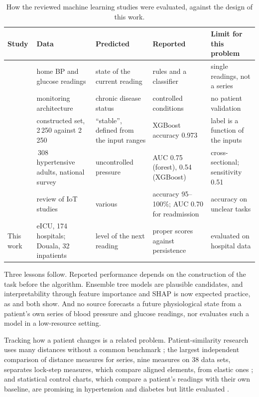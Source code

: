 \begin{table}[htbp]
\centering\footnotesize
\caption{How the reviewed machine learning studies were evaluated, against the design of this work.}\label{tab:ml-studies}
\begin{tabularx}{\textwidth}{@{}>{\raggedright\arraybackslash}p{2.3cm} >{\raggedright\arraybackslash}X >{\raggedright\arraybackslash}X >{\raggedright\arraybackslash}X >{\raggedright\arraybackslash}X@{}}
\toprule
\textbf{Study} & \textbf{Data} & \textbf{Predicted} & \textbf{Reported} & \textbf{Limit for this problem} \\
\midrule
\textcite{chatrati2022} & home BP and glucose readings & state of the current reading & rules and a classifier & single readings, not a series \\
\textcite{tai2024} & monitoring architecture & chronic disease status & controlled conditions & no patient validation \\
\textcite{efendi2025} & constructed set, 2\,250 against 2\,250 & ``stable'', defined from the input ranges & XGBoost accuracy 0.973 & label is a function of the inputs \\
\textcite{mendoza2025} & 1\,308 hypertensive adults, national survey & uncontrolled pressure & AUC 0.75 (forest), 0.54 (XGBoost) & cross-sectional; sensitivity 0.51 \\
\textcite{liu2025review} & review of IoT studies & various & accuracy 95--100\%; AUC 0.70 for readmission & accuracy on unclear tasks \\
\addlinespace
This work & eICU, 174 hospitals; Douala, 32 inpatients & level of the next reading & proper scores against persistence & evaluated on hospital data \\
\bottomrule
\end{tabularx}
\end{table}

Three lessons follow. Reported performance depends on the construction of the task before the algorithm. Ensemble tree models are plausible candidates, and interpretability through feature importance and SHAP is now expected practice, as \textcite{mendoza2025} and \textcite{liu2025ppg} both show. And no source forecasts a future physiological state from a patient's own series of blood pressure and glucose readings, nor evaluates such a model in a low-resource setting.

Tracking how a patient changes is a related problem. Patient-similarity research uses many distances without a common benchmark \parencite{parimbelli2018,sharafoddini2017}; the largest independent comparison of distance measures for series, nine measures on 38 data sets, separates lock-step measures, which compare aligned elements, from elastic ones \parencite{wang2013timeseries}; and statistical control charts, which compare a patient's readings with their own baseline, are promising in hypertension and diabetes but little evaluated \parencite{tennant2007}.

